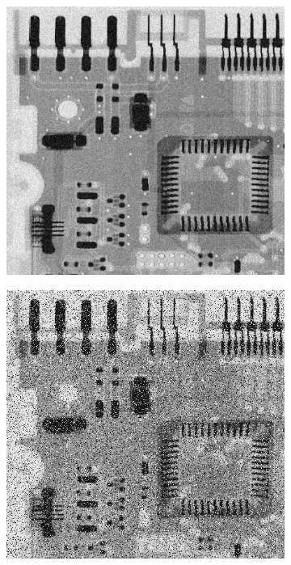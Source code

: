 \begin{figure}[h]
	\centering
	\begin{subfigure}[b]{0.4\linewidth}
		\includegraphics[width=\linewidth]{myfigure/p4/42-uniform.png}
		\caption{}
		\label{fig:5-12a}
	\end{subfigure}
	\begin{subfigure}[b]{0.4\linewidth}
		\includegraphics[width=\linewidth]{myfigure/p4/42-unipepsalt.png}

\end{subfigure}
\end{figure}

